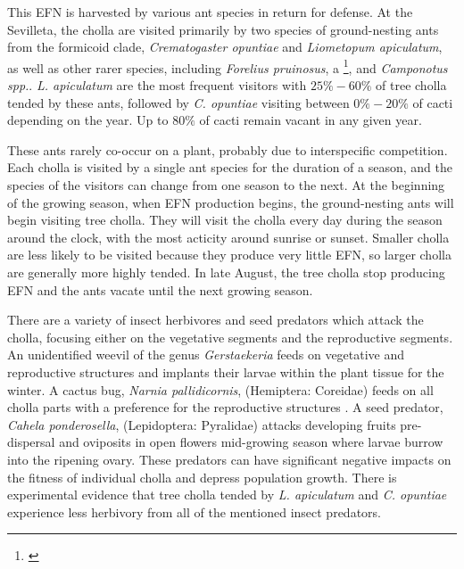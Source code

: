 \documentclass[11pt]{article}\usepackage[sc]{mathpazo} %
\newcommand{\tom}[2]{{\color{red}{#1}}\footnote{\textit{\color{red}{#2}}}}
\begin{document}
  This EFN is harvested by various ant species in return for defense. 
At the Sevilleta, the cholla are visited primarily by two species of ground-nesting ants from the formicoid clade, \textit{Crematogaster opuntiae} and \textit{Liometopum apiculatum}, as well as other rarer species, including \textit{Forelius pruinosus}, a \tom{\textit{Phenogaster spp.}}{Incorrect spelling.}, and \textit{Camponotus spp.}.
\textit{L. apiculatum} are the most frequent visitors with $25\% - 60\%$ of tree cholla tended by these ants, followed by \textit{C. opuntiae} visiting between $0\% - 20\%$ of cacti\cite{Donald2022} depending on the year. Up to $80\%$ of cacti remain vacant in any given year. 

  These ants rarely co-occur on a plant, probably due to interspecific competition\cite{Miller2007}.
Each cholla is visited by a single ant species for the duration of a season, and the species of the visitors can change from one season to the next. 
At the beginning of the growing season, when EFN production begins, the ground-nesting ants will begin visiting tree cholla.
They will visit the cholla every day during the season around the clock, with the most acticity around sunrise or sunset\cite{Ohm2014}. 
Smaller cholla are less likely to be visited because they produce very little EFN, so larger cholla are generally more highly tended\cite{Miller2014}. 
In late August, the tree cholla stop producing EFN and the ants vacate until the next growing season. 

  There are a variety of insect herbivores and seed predators which attack the cholla, focusing either on the vegetative segments and the reproductive segments\cite{Mann1969}. 
An unidentified weevil of the genus \textit{Gerstaekeria} feeds on vegetative and reproductive structures and implants their larvae within the plant tissue for the winter. 
A cactus bug, \textit{Narnia pallidicornis}, (Hemiptera: Coreidae) feeds on all cholla parts with a preference for the reproductive structures \cite{Miller2006}.
A seed predator, \textit{Cahela ponderosella}, (Lepidoptera: Pyralidae) attacks developing fruits pre-dispersal and oviposits in open flowers mid-growing season where larvae burrow into the ripening ovary. 
These predators can have significant negative impacts on the fitness of individual cholla and depress population growth\cite{Miller2009}.
There is experimental evidence that tree cholla tended by \textit{L. apiculatum} and \textit{C. opuntiae} experience less herbivory from all of the mentioned insect predators\cite{Miller2007}. 
\end{document}

